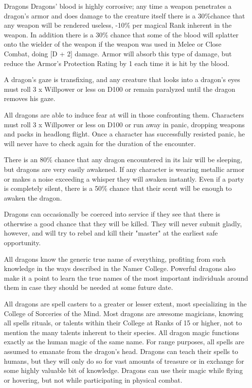 \begin{mmgroup}{Dragons}
Dragons' blood is highly corrosive; any time a weapon penetrates a
dragon's armor and does damage to the creature itself there is a 30\%chance that any weapon will be rendered useless, -10\% per magical Rank
inherent in the weapon.  In addition there is a 30\% chance that some
of the blood will splatter onto the wielder of the weapon if the
weapon was used in Melee or Close Combat, doing [D + 2] damage.  Armor
will absorb this type of damage, but reduce the Armor's Protection
Rating by 1 each time it is hit by the blood.

A dragon's gaze is transfixing, and any creature that looks into a
dragon's eyes must roll 3 x Willpower or less on D100 or remain
paralyzed until the dragon removes his gaze.

All dragons are able to induce fear at will in those confronting
them. Characters must roll 3 x Willpower or less on D100 or run away
in panic, dropping weapons and packs in headlong flight.  Once a
character has successfully resisted panic, he will never have to check
again for the duration of the encounter.

There is an 80\% chance that any dragon encountered in its lair will be
sleeping, but dragons are very easily awakened.  If any character is
wearing metallic armor or makes a noise exceeding a whisper they will
awaken instantly.  Even if a party is completely silent, there is a
50\% chance that their scent will be enough to awaken the dragon.

Dragons can occasionally be coerced into service if they see that
there is otherwise a good chance that they will be killed.  They will
never submit gladly, however, and will try to rebel and kill their
"master" at the earliest safe opportunity.

All dragons know the generic true name of everything, profiting from
such knowledge in the ways described in the Namer College. Powerful
dragons also make it a point to learn the true names of the most
important individuals around them in case they should be needed at
some future date.

All dragons are spell casters to a greater or lesser extent, most
specializing in the College of Sorceries of the Mind.  Most dragons
are awesome magicians, knowing all spells rituals, or talents within
their College at Ranks of 15 or higher, not to mention the many
talents inherent to their species.  All dragon magic functions exactly
as the human magic of the same name.  For range purposes, all spells
are assumed to emanate from the dragon's head.  Dragons can teach
their spells to humans, but they will only do so for vast amounts of
treasure or in exchange for some highly valuable bit of knowledge.
Dragons can use their magic while flying or hovering, but not while
participating in physical combat.


\end{mmgroup}
